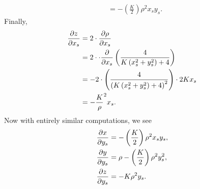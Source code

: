 \documentclass{ximera}
\begin{document}
\begin{problem}
\begin{freeResponse}
\begin{align*}
      &= -\left(\frac{K}{2}\right)\rho^2x_sy_s.
      \end{align*}
      Finally,
      \begin{align*}
      \pp[z]{x_s} &= 2\cdot\pp[\rho]{x_s}\\
      &= 2\cdot\cdot \pp{x_s}\left(\frac{4}{K\left(x_s^2 + y_s^2\right) + 4}\right)\\
      &= - 2\cdot \left(\frac{4}{\left(K\left(x_s^2 + y_s^2\right) + 4\right)^{2}}\right)\cdot2Kx_s \\
      &= -\frac{K}\rho^2x_s.
      \end{align*}
      Now with entirely similar computations, we see
      \begin{align*}
        \pp[x]{y_s} &= -\left(\frac{K}{2}\right)\rho^2x_sy_s,\\
        \pp[y]{y_s} &=\rho-\left(\frac{K}{2}\right)\rho^2y_s^2,\\
        \pp[z]{y_s} &= -K\rho^2y_s.       
      \end{align*}
  \end{freeResponse}
\end{problem}
\end{document}
